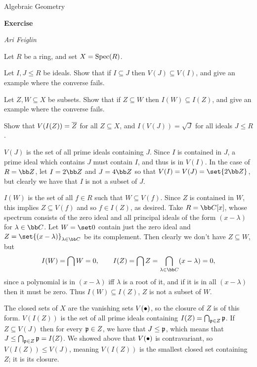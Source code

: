 



\def\printmcount{\the\counter{section}.\the\counter{math counter}}
\setcounter{section}{2}

\centerline{Algebraic Geometry}
\medskip
\centerline{\bf Exercise \the{}}
\smallskip
\centerline{\it Ari Feiglin}

\bprob

    Let $R$ be a ring, and set $X={\rm Spec}(R)$.
    \benum
        \item Let $I,J\leq R$ be ideals.
        Show that if $I\subseteq J$ then $V(J)\subseteq V(I)$, and give an example where the converse fails.
        \item Let $Z,W\subseteq X$ be subsets.
        Show that if $Z\subseteq W$ then $I(W)\subseteq I(Z)$, and give an example where the converse fails.
        \item Show that $V(I(Z))={\overline{Z}}$ for all $Z\subseteq X$, and $I(V(J))=\sqrt J$ for all ideals $J\leq R$.
    \eenum

\eprob

\benum
    \item $V(J)$ is the set of all prime ideals containing $J$.
    Since $I$ is contained in $J$, a prime ideal which contains $J$ must contain $I$, and thus is in $V(I)$.
    In the case of $R=\bZ$, let $I=2\bZ$ and $J=4\bZ$ so that $V(I)=V(J)=\set{2\bZ}$, but clearly we have that $I$ is not a subset of $J$.

    \item $I(W)$ is the set of all $f\in R$ such that $W\subseteq V(f)$.
    Since $Z$ is contained in $W$, this implies $Z\subseteq V(f)$ and so $f\in I(Z)$, as desired.
    Take $R=\bC[x]$, whose spectrum consists of the zero ideal and all principal ideals of the form $(x-\lambda)$ for $\lambda\in\bC$.
    Let $W=\set0$ contain just the zero ideal and $Z=\set{(x-\lambda)}_{\lambda\in\bC}$ be its complement.
    Then clearly we don't have $Z\subseteq W$, but
    $$ I(W) = \bigcap W = 0,\qquad I(Z) = \bigcap Z = \bigcap_{\lambda\in\bC}(x-\lambda) = 0 , $$
    since a polynomial is in $(x-\lambda)$ iff $\lambda$ is a root of it, and if it is in all $(x-\lambda)$ then it must be zero.
    Thus $I(W)\subseteq I(Z)$, $Z$ is not a subset of $W$.

    \item The closed sets of $X$ are the vanishing sets $V(\bullet)$, so the closure of $Z$ is of this form.
    $V(I(Z))$ is the set of all prime ideals containing $I(Z)=\bigcap_{{{\frak p}}\in Z}{{\frak p}}$.
    If $Z\subseteq V(J)$ then for every ${{\frak p}}\in Z$, we have that $J\leq{{\frak p}}$, which means that $J\leq\bigcap_{{{\frak p}}\in Z}{{\frak p}}=I(Z)$.
    We showed above that $V(\bullet)$ is contravariant, so $V(I(Z))\leq V(J)$, meaning $V(I(Z))$ is the smallest closed set containing $Z$;
    it is its closure.

